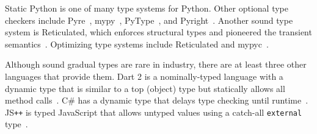 \documentclass[english,cleveref,submission]{programming}
\newcommand{\SP}{Static Python}
\newcommand{\JSPP}{JS\code{++}}
\newcommand{\code}[1]{\texttt{#1}}
\begin{document}
\SP{} is one of many type systems for Python.
Other optional type checkers include Pyre~\cite{pyre},
mypy~\cite{mypy}, PyType~\cite{pytype}, and Pyright~\cite{pyright}.
Another sound type system is Reticulated, which enforces structural types and
pioneered the transient semantics~\cite{vss-popl-2017,v-thesis-2019}.
Optimizing type systems include Reticulated and mypyc~\cite{mypyc}.

Although sound gradual types are rare in industry, there are at
least three other languages that provide them.
Dart 2 is a nominally-typed language with a dynamic type that is similar
to a top (object) type but statically allows all method calls~\cite{dart-types}.
C\# has a dynamic type that delays type checking until runtime~\cite{bmt-ecoop-2010}.
\JSPP{} is typed JavaScript that allows untyped values
using a catch-all \code{external} type~\cite{jspp}.



\end{document}
